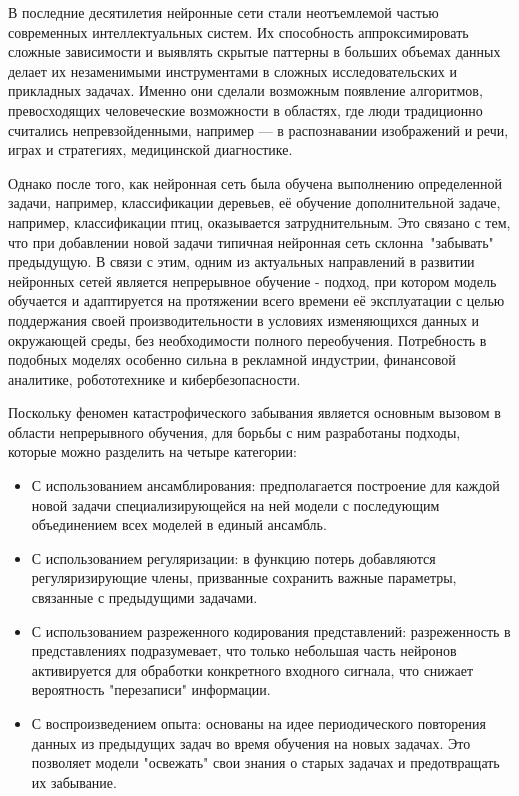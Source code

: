 \documentclass[a4paper,article,14pt]{extarticle}
\begin{document}

В последние десятилетия нейронные сети стали неотъемлемой частью современных 
интеллектуальных систем. Их способность аппроксимировать сложные зависимости и 
выявлять скрытые паттерны в больших объемах данных делает их незаменимыми 
инструментами в сложных исследовательских и прикладных задачах. Именно они
сделали возможным появление алгоритмов, превосходящих человеческие возможности в
областях, где люди традиционно считались непревзойденными, например — в 
распознавании изображений и речи, играх и стратегиях, медицинской диагностике.

Однако после того, как нейронная сеть была обучена выполнению определенной 
задачи, например, классификации деревьев, её обучение дополнительной задаче, 
например, классификации птиц, оказывается затруднительным. Это связано с тем, 
что при добавлении новой задачи типичная нейронная сеть склонна\, "забывать"\, 
предыдущую. В связи с этим, одним из актуальных направлений в развитии нейронных
сетей является непрерывное обучение - подход, при котором модель обучается и 
адаптируется на протяжении всего времени её эксплуатации с целью поддержания 
своей производительности в условиях изменяющихся данных и окружающей среды, без 
необходимости полного переобучения. Потребность в подобных моделях особенно 
сильна в рекламной индустрии, финансовой аналитике, робототехнике и 
кибербезопасности.

Поскольку феномен катастрофического забывания является основным вызовом в 
области непрерывного обучения, для борьбы с ним разработаны подходы, которые 
можно разделить на четыре категории:
\begin{itemize}
    \item С использованием ансамблирования: предполагается построение для каждой 
    новой задачи специализирующейся на ней модели с последующим объединением 
    всех моделей в единый ансамбль.
    \item С использованием регуляризации: в функцию потерь добавляются 
    регуляризирующие члены, призванные сохранить важные параметры, связанные с 
    предыдущими задачами.
    
    \pagebreak %
    
    \item С использованием разреженного кодирования представлений: разреженность
    в представлениях подразумевает, что только небольшая часть нейронов 
    активируется для обработки конкретного входного сигнала, что снижает 
    вероятность "перезаписи" информации.
    \item С воспроизведением опыта: основаны на идее периодического повторения 
    данных из предыдущих задач во время обучения на новых задачах. Это позволяет 
    модели "освежать" свои знания о старых задачах и предотвращать их забывание.
\end{itemize}
\end{document}
